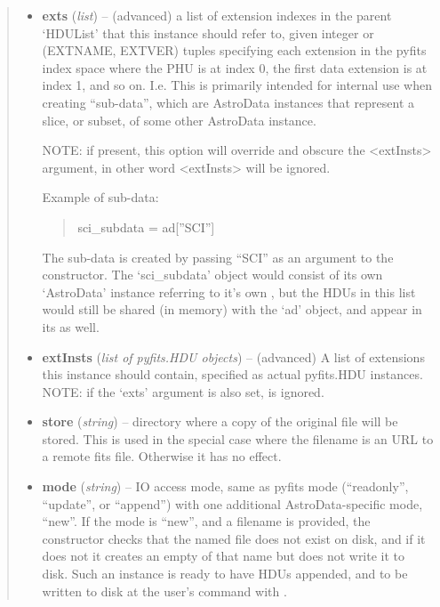 \documentclass[letterpaper,10pt,english]{sphinxmanual}
\begin{document}
\begin{fulllineitems}
\begin{quote}
\begin{description}
\begin{itemize}
\item {} 
\textbf{exts} (\emph{list}) -- 
(advanced) a list of extension indexes in the parent
`HDUList' that this instance should refer to, given  integer or 
(EXTNAME, EXTVER) tuples specifying each extension in the pyfits
index space where the PHU is at index 0, the first data extension
is at index 1, and so on. I.e. This is primarily intended for 
internal use when creating ``sub-data'', which are AstroData instances
that represent a slice, or subset, of some other AstroData instance.

NOTE: if present, this option will override and obscure the 
\textless{}extInsts\textgreater{} argument, in other word \textless{}extInsts\textgreater{} will be ignored.

Example of sub-data:
\begin{quote}

sci\_subdata = ad{[}''SCI''{]}
\end{quote}

The sub-data is created by passing ``SCI'' as an argument to the
constructor. The `sci\_subdata' object would consist of its own 
`AstroData' instance referring to it's own , but the 
HDUs in this list would still be shared (in memory) with the `ad'
object, and appear in its  as well.


\item {} 
\textbf{extInsts} (\emph{list of pyfits.HDU objects}) -- (advanced) A list of extensions this instance should 
contain, specified as actual pyfits.HDU instances. NOTE: if the 
`exts' argument is also set,  is ignored.

\item {} 
\textbf{store} (\emph{string}) -- directory where a copy of the original file will be 
stored.  This is used in the special case where the
filename is an URL to a remote fits file.  Otherwise it has
no effect.

\item {} 
\textbf{mode} (\emph{string}) -- IO access mode, same as pyfits mode (``readonly'', ``update'',
or ``append'') with one additional AstroData-specific mode, ``new''.
If the mode is ``new'', and a filename is provided, the constructor
checks that the named file does not exist on disk,
and if it does not it creates an empty  of that name 
but does not write it to disk. Such an  
instance is ready to have HDUs appended, and to be written to disk
at the user's command with .


\end{itemize}
\end{description}
\end{quote}
\end{fulllineitems}
\end{document}

